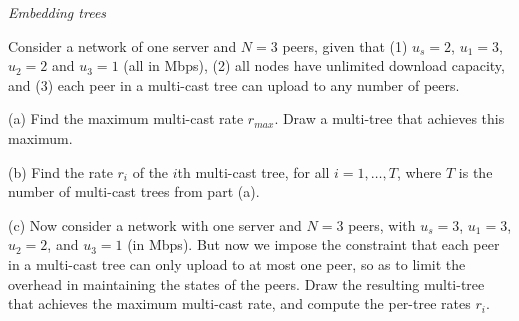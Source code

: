 \documentclass[12pt]{article}
\newenvironment{problem}[2][Problem]{\begin{trivlist}
\item[\hskip \labelsep {\bfseries #1}\hskip \labelsep {\bfseries #2.}]}{\end{trivlist}}
\begin{document}
\begin{problem}{1}
	\textit{Embedding trees}\par
	Consider a network of one server and $N = 3$ peers, given that (1) $ u_s = 2 $, $ u_1 = 3 $, $ u_2 = 2 $ and $ u_3 = 1 $ (all in Mbps), (2) all nodes have unlimited download capacity, and (3) each peer in a multi-cast tree can upload to any number of peers.\par
	(a) Find the maximum multi-cast rate $ r_{max} $. Draw a multi-tree that achieves this maximum. \par
	(b) Find the rate $ r_i $ of the $ i $th multi-cast tree, for all $ i = 1,\dots,T $, where $ T $ is the number of multi-cast trees from part (a). \par
	(c) Now consider a network with one server and $ N = 3 $ peers, with $ u_s = 3 $, $ u_1 = 3 $, $ u_2 = 2 $, and $ u_3 = 1 $ (in Mbps). But now we impose the constraint that each peer in a multi-cast tree can only upload to at most one peer, so as to limit the overhead in maintaining the states of the peers. Draw the resulting multi-tree that achieves the maximum multi-cast rate, and compute the per-tree rates $ r_i $.
\end{problem}
\end{document}
